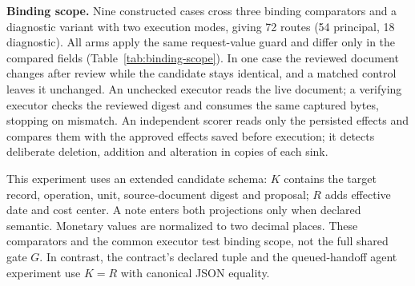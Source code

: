 \documentclass[pdflatex,sn-basic]{sn-jnl}
\begin{document}
\textbf{Binding scope.} Nine constructed cases cross three binding comparators and a diagnostic variant with two execution modes, giving 72 routes (54 principal, 18 diagnostic). All arms apply the same request-value guard and differ only in the compared fields (Table~\ref{tab:binding-scope}). In one case the reviewed document changes after review while the candidate stays identical, and a matched control leaves it unchanged. An unchecked executor reads the live document; a verifying executor checks the reviewed digest and consumes the same captured bytes, stopping on mismatch. An independent scorer reads only the persisted effects and compares them with the approved effects saved before execution; it detects deliberate deletion, addition and alteration in copies of each sink.

This experiment uses an extended candidate schema: $K$ contains the target record, operation, unit, source-document digest and proposal; $R$ adds effective date and cost center. A note enters both projections only when declared semantic. Monetary values are normalized to two decimal places. These comparators and the common executor test binding scope, not the full shared gate $G$. In contrast, the contract's declared tuple and the queued-handoff agent experiment use $K=R$ with canonical JSON equality.
\end{document}
